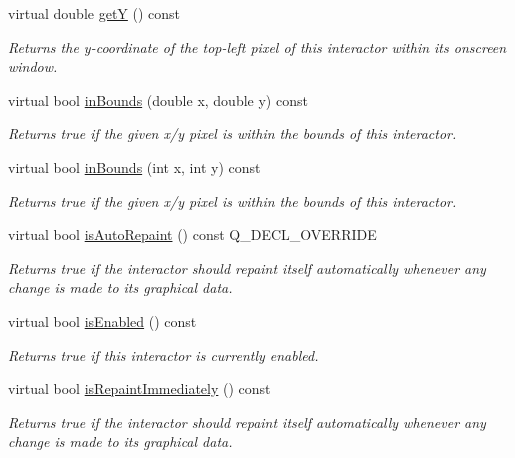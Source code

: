 \begin{DoxyCompactItemize}
virtual double \mbox{\hyperlink{classGInteractor_aafa51c7f8f38a09febbb9ce7853f77b4}{getY}} () const
\begin{DoxyCompactList}\small\item\em Returns the y-\/coordinate of the top-\/left pixel of this interactor within its onscreen window. \end{DoxyCompactList}\item 
virtual bool \mbox{\hyperlink{classGInteractor_afc480f652b8c5f1fb255e2269ce68879}{in\+Bounds}} (double x, double y) const
\begin{DoxyCompactList}\small\item\em Returns true if the given x/y pixel is within the bounds of this interactor. \end{DoxyCompactList}\item 
virtual bool \mbox{\hyperlink{classGInteractor_ae6d7982c1c627b677a5e776ca86118ed}{in\+Bounds}} (int x, int y) const
\begin{DoxyCompactList}\small\item\em Returns true if the given x/y pixel is within the bounds of this interactor. \end{DoxyCompactList}\item 
virtual bool \mbox{\hyperlink{classGCanvas_aa0b3b78666686fcd2a5b33a20febef0f}{is\+Auto\+Repaint}} () const Q\+\_\+\+D\+E\+C\+L\+\_\+\+O\+V\+E\+R\+R\+I\+DE
\begin{DoxyCompactList}\small\item\em Returns true if the interactor should repaint itself automatically whenever any change is made to its graphical data. \end{DoxyCompactList}\item 
virtual bool \mbox{\hyperlink{classGInteractor_aacb819fb241851fd9fc045271baa4034}{is\+Enabled}} () const
\begin{DoxyCompactList}\small\item\em Returns true if this interactor is currently enabled. \end{DoxyCompactList}\item 
virtual bool \mbox{\hyperlink{classGDrawingSurface_a82a00267c81cc0ae85ee0feb01a92fa8}{is\+Repaint\+Immediately}} () const
\begin{DoxyCompactList}\small\item\em Returns true if the interactor should repaint itself automatically whenever any change is made to its graphical data. \end{DoxyCompactList}\item 

\end{DoxyCompactItemize}
